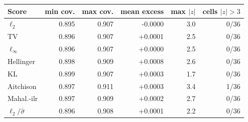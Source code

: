 \begin{tabular}{lrrrrr}
\toprule
Score & min cov. & max cov. & mean excess & max $|z|$ & cells $|z|>3$ \\
\midrule
$\ell_2$ & 0.895 & 0.907 & -0.0000 & 3.0 & 0/36 \\
TV & 0.896 & 0.907 & +0.0001 & 2.5 & 0/36 \\
$\ell_\infty$ & 0.896 & 0.907 & +0.0000 & 2.5 & 0/36 \\
Hellinger & 0.898 & 0.909 & +0.0008 & 2.6 & 0/36 \\
KL & 0.899 & 0.907 & +0.0003 & 1.7 & 0/36 \\
Aitchison & 0.897 & 0.911 & +0.0003 & 3.4 & 1/36 \\
Mahal.-ilr & 0.897 & 0.909 & +0.0002 & 2.7 & 0/36 \\
$\ell_2/\hat\sigma$ & 0.896 & 0.908 & +0.0001 & 2.2 & 0/36 \\
\bottomrule
\end{tabular}